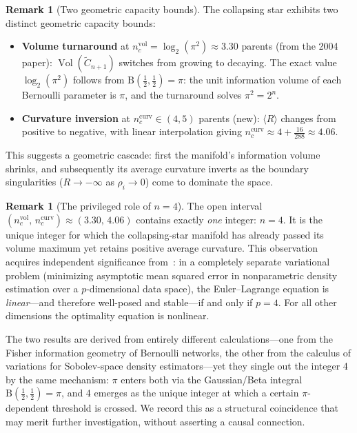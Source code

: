 \documentclass[11pt]{article}
\theoremstyle{definition}
\newtheorem{remark}[theorem]{Remark}
\DeclareMathOperator{\Vol}{Vol}
\begin{document}
\begin{remark}[Two geometric capacity bounds]
The collapsing star exhibits two distinct geometric capacity bounds:
\begin{itemize}
\item \textbf{Volume turnaround} at $n_c^{\mathrm{vol}} = \log_2(\pi^2) \approx 3.30$ parents 
  (from the 2004 paper): $\Vol(\tilde{C}_{n+1})$ switches from growing to decaying.
  The exact value $\log_2(\pi^2)$ follows from $\mathrm{B}(\tfrac{1}{2},\tfrac{1}{2})=\pi$: 
  the unit information volume of each Bernoulli parameter is $\pi$, and the turnaround 
  solves $\pi^2 = 2^n$.
\item \textbf{Curvature inversion} at $n_c^{\mathrm{curv}} \in (4,5)$ parents 
  (new): $\langle R\rangle$ changes from positive to negative, with linear interpolation 
  giving $n_c^{\mathrm{curv}} \approx 4 + \tfrac{16}{288} \approx 4.06$.
\end{itemize}
This suggests a geometric cascade: first the manifold's information volume 
shrinks, and subsequently its average curvature inverts as the boundary 
singularities ($R \to -\infty$ as $\rho_i \to 0$) come to dominate the space.
\end{remark}

\begin{remark}[The privileged role of $n=4$]\label{rem:p4}
The open interval $(n_c^{\mathrm{vol}},\, n_c^{\mathrm{curv}}) \approx (3.30,\, 4.06)$ 
contains exactly \emph{one} integer: $n = 4$.  It is the unique integer 
for which the collapsing-star manifold has already passed its volume 
maximum yet retains positive average curvature.  
This observation acquires independent significance from~\cite{Rod00}: 
in a completely separate variational problem (minimizing asymptotic mean 
squared error in nonparametric density estimation over a $p$-dimensional 
data space), the Euler--Lagrange equation is \emph{linear}---and therefore 
well-posed and stable---if and only if $p = 4$.  For all other dimensions 
the optimality equation is nonlinear.

The two results are derived from entirely different calculations---one from 
the Fisher information geometry of Bernoulli networks, the other from the 
calculus of variations for Sobolev-space density estimators---yet they 
single out the integer 4 by the same mechanism: $\pi$ enters both via the 
Gaussian/Beta integral $\mathrm{B}(\tfrac{1}{2},\tfrac{1}{2})=\pi$, and 
4 emerges as the unique integer at which a certain $\pi$-dependent 
threshold is crossed.  We record this as a structural coincidence 
that may merit further investigation, without asserting a causal connection.
\end{remark}
\end{document}
